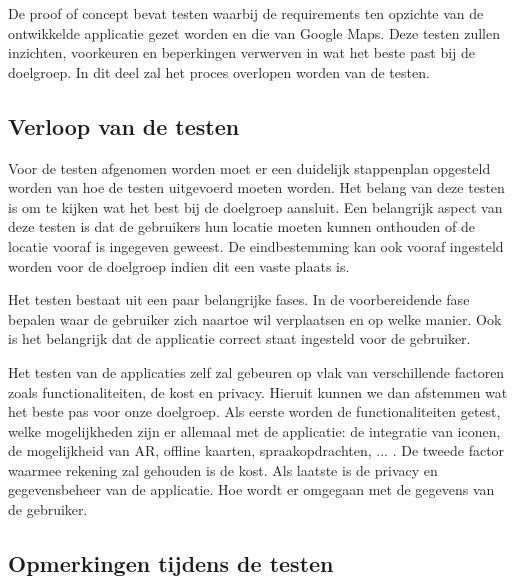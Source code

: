 De proof of concept bevat testen waarbij de requirements ten opzichte van de ontwikkelde applicatie gezet worden en die van Google Maps. Deze testen zullen inzichten, voorkeuren en beperkingen verwerven in wat het beste past bij de doelgroep. In dit deel zal het proces overlopen worden van de testen.

\subsection{Verloop van de testen}
\label{sec:verloop van de testen}

Voor de testen afgenomen worden moet er een duidelijk stappenplan opgesteld worden van hoe de testen uitgevoerd moeten worden. Het belang van deze testen is om te kijken wat het best bij de doelgroep aansluit. Een belangrijk aspect van deze testen is dat de gebruikers hun locatie moeten kunnen onthouden of de locatie vooraf is ingegeven geweest. De eindbestemming kan ook vooraf ingesteld worden voor de doelgroep indien dit een vaste plaats is. \newline

Het testen bestaat uit een paar belangrijke fases. In de voorbereidende fase bepalen waar de gebruiker zich naartoe wil verplaatsen en op welke manier. Ook is het belangrijk dat de applicatie correct staat ingesteld voor de gebruiker.\newline

Het testen van de applicaties zelf zal gebeuren op vlak van verschillende factoren zoals functionaliteiten, de kost en privacy. Hieruit kunnen we dan afstemmen wat het beste pas voor onze doelgroep. Als eerste worden de functionaliteiten getest, welke mogelijkheden zijn er allemaal met de applicatie: de integratie van iconen, de mogelijkheid van AR, offline kaarten, spraakopdrachten, ... . De tweede factor waarmee rekening zal gehouden is de kost. Als laatste is de privacy en gegevensbeheer van de applicatie. Hoe wordt er omgegaan met de gegevens van de gebruiker.

\subsection{Opmerkingen tijdens de testen}
\label{sec:opmerkingen tijdens de testen}

